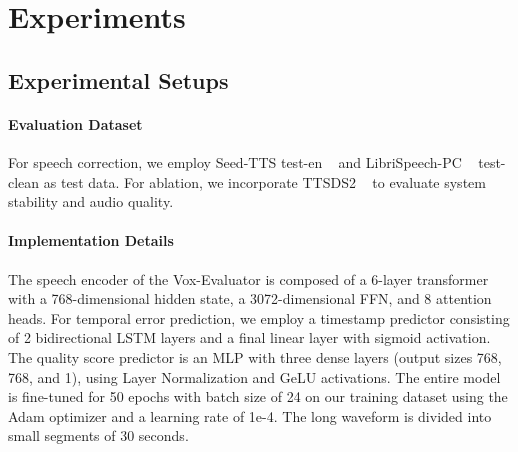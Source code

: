 \documentclass[letterpaper]{article} %
\begin{document}
\section{Experiments}
\subsection{Experimental Setups} 
\paragraph{Evaluation Dataset}
For speech correction, we employ Seed-TTS test-en ~\cite{anastassiou2024seed} and LibriSpeech-PC ~\cite{meister2023librispeech} test-clean as test data. For ablation, we incorporate TTSDS2 ~\cite{minixhofer2025ttsds2} to evaluate system stability and audio quality. 

\paragraph{Implementation Details}
The speech encoder of the Vox-Evaluator is composed of a 6-layer transformer with a 768-dimensional hidden state, a 3072-dimensional FFN, and 8 attention heads. For temporal error prediction, we employ a timestamp predictor consisting of 2 bidirectional LSTM layers and a final linear layer with sigmoid activation. The quality score predictor is an MLP with three dense layers (output sizes 768, 768, and 1), using Layer Normalization and GeLU activations. The entire model is fine-tuned for 50 epochs with batch size of 24 on our training dataset using the Adam optimizer and a learning rate of 1e-4. The long waveform is divided into small segments of 30 seconds.
\end{document}
